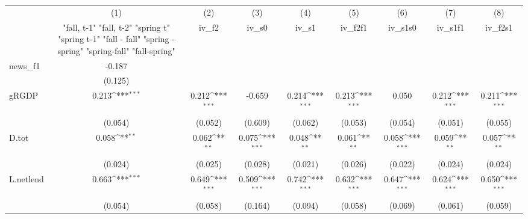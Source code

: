 {
\def\sym#1{\ifmmode^{#1}\else\(^{#1}\)\fi}
\begin{tabular}{l*{8}{c}}
\toprule
            &\multicolumn{1}{c}{(1)}&\multicolumn{1}{c}{(2)}&\multicolumn{1}{c}{(3)}&\multicolumn{1}{c}{(4)}&\multicolumn{1}{c}{(5)}&\multicolumn{1}{c}{(6)}&\multicolumn{1}{c}{(7)}&\multicolumn{1}{c}{(8)}\\
            &\multicolumn{1}{c}{  "fall, t-1" "fall, t-2" "spring t" "spring t-1"  "fall - fall" "spring - spring" "spring-fall" "fall-spring" }&\multicolumn{1}{c}{iv\_f2}&\multicolumn{1}{c}{iv\_s0}&\multicolumn{1}{c}{iv\_s1}&\multicolumn{1}{c}{iv\_f2f1}&\multicolumn{1}{c}{iv\_s1s0}&\multicolumn{1}{c}{iv\_s1f1}&\multicolumn{1}{c}{iv\_f2s1}\\
\midrule
news\_f1     &      -0.187         &                     &                     &                     &                     &                     &                     &                     \\
            &     (0.125)         &                     &                     &                     &                     &                     &                     &                     \\
\addlinespace
gRGDP       &       0.213\sym{***}&       0.212\sym{***}&      -0.659         &       0.214\sym{***}&       0.213\sym{***}&       0.050         &       0.212\sym{***}&       0.211\sym{***}\\
            &     (0.054)         &     (0.052)         &     (0.609)         &     (0.062)         &     (0.053)         &     (0.054)         &     (0.051)         &     (0.055)         \\
\addlinespace
D.tot       &       0.058\sym{**} &       0.062\sym{**} &       0.075\sym{***}&       0.048\sym{**} &       0.061\sym{**} &       0.058\sym{***}&       0.059\sym{**} &       0.057\sym{**} \\
            &     (0.024)         &     (0.025)         &     (0.028)         &     (0.021)         &     (0.026)         &     (0.022)         &     (0.024)         &     (0.024)         \\
\addlinespace
L.netlend   &       0.663\sym{***}&       0.649\sym{***}&       0.509\sym{***}&       0.742\sym{***}&       0.632\sym{***}&       0.647\sym{***}&       0.624\sym{***}&       0.650\sym{***}\\
            &     (0.054)         &     (0.058)         &     (0.164)         &     (0.094)         &     (0.058)         &     (0.069)         &     (0.061)         &     (0.059)         \\

\end{tabular}}
